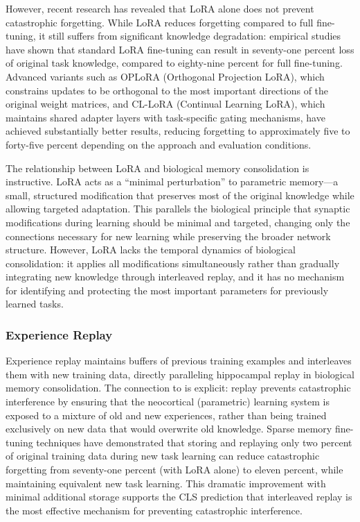 \documentclass[11pt,letterpaper]{article}
\begin{document}
However, recent research has revealed that LoRA alone does not prevent catastrophic forgetting. While LoRA reduces forgetting compared to full fine-tuning, it still suffers from significant knowledge degradation: empirical studies have shown that standard LoRA fine-tuning can result in seventy-one percent loss of original task knowledge, compared to eighty-nine percent for full fine-tuning. Advanced variants such as OPLoRA (Orthogonal Projection LoRA), which constrains updates to be orthogonal to the most important directions of the original weight matrices, and CL-LoRA (Continual Learning LoRA), which maintains shared adapter layers with task-specific gating mechanisms, have achieved substantially better results, reducing forgetting to approximately five to forty-five percent depending on the approach and evaluation conditions.

The relationship between LoRA and biological memory consolidation is instructive. LoRA acts as a ``minimal perturbation'' to parametric memory---a small, structured modification that preserves most of the original knowledge while allowing targeted adaptation. This parallels the biological principle that synaptic modifications during learning should be minimal and targeted, changing only the connections necessary for new learning while preserving the broader network structure. However, LoRA lacks the temporal dynamics of biological consolidation: it applies all modifications simultaneously rather than gradually integrating new knowledge through interleaved replay, and it has no mechanism for identifying and protecting the most important parameters for previously learned tasks.

\subsubsection{Experience Replay}

Experience replay maintains buffers of previous training examples and interleaves them with new training data, directly paralleling hippocampal replay in biological memory consolidation. The connection to \cite{mcclelland1995complementary} is explicit: replay prevents catastrophic interference by ensuring that the neocortical (parametric) learning system is exposed to a mixture of old and new experiences, rather than being trained exclusively on new data that would overwrite old knowledge. Sparse memory fine-tuning techniques have demonstrated that storing and replaying only two percent of original training data during new task learning can reduce catastrophic forgetting from seventy-one percent (with LoRA alone) to eleven percent, while maintaining equivalent new task learning. This dramatic improvement with minimal additional storage supports the CLS prediction that interleaved replay is the most effective mechanism for preventing catastrophic interference.
\end{document}
